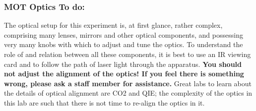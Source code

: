 \documentclass{../lab}
\begin{document}
\subsubsection{MOT Optics To do:}

The optical setup for this experiment is, at first glance, rather complex, comprising many lenses, mirrors and other optical components, and possessing very many knobs with which to adjust and tune the optics. To understand the role of and relation between all these components, it is best to use an IR viewing card and to follow the path of laser light through the apparatus. \textbf{You should not adjust the alignment of the optics! If you feel there is something wrong, please ask a staff member for assistance.} Great labs to learn about the details of optical alignment are CO2 and QIE; the complexity of the optics in this lab are such that there is not time to re-align the optics in it.

\end{document}
